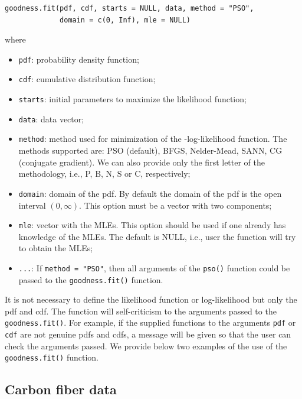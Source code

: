 \documentclass[10pt,letterpaper]{article}
\begin{document}
\begin{verbatim}
goodness.fit(pdf, cdf, starts = NULL, data, method = "PSO", 
             domain = c(0, Inf), mle = NULL)
\end{verbatim}
where
\begin{itemize}
	\item \texttt{pdf}: probability density function;
	\item \texttt{cdf}: cumulative distribution function;
	\item \texttt{starts}: initial parameters to maximize the likelihood function;
	\item \texttt{data}: data vector;
	\item \texttt{method}: method used for minimization of the -log-likelihood function. The methods supported are: PSO (default), BFGS, Nelder-Mead, SANN, CG (conjugate gradient). We can also provide only the first letter of the methodology, i.e., P, B, N, S or C, respectively;
	\item \texttt{domain}: domain of the pdf. By default the domain of the pdf is the open interval $(0, \infty)$. This option must be a vector with two components;
	\item \texttt{mle}: vector with the MLEs. This option should be used if one already has knowledge of the MLEs. The default is NULL, i.e., user the function will try to obtain the MLEs;
	\item \texttt{...}: If \texttt{method = "PSO"}, then all arguments of the \texttt{pso()} function could be passed to the \texttt{goodness.fit()} function.
\end{itemize}


It is not necessary to define the likelihood function or log-likelihood but only the pdf and cdf.
The function will self-criticism to the arguments passed to the \texttt{goodness.fit()}. For example, if the supplied
functions to the arguments \texttt{pdf} or \texttt{cdf} are not genuine pdfs and cdfs, a message will be given so that the user
can check the arguments passed. We provide below two examples of the use of the \texttt{goodness.fit()} function.

\subsection{Carbon fiber data}
\end{document}
